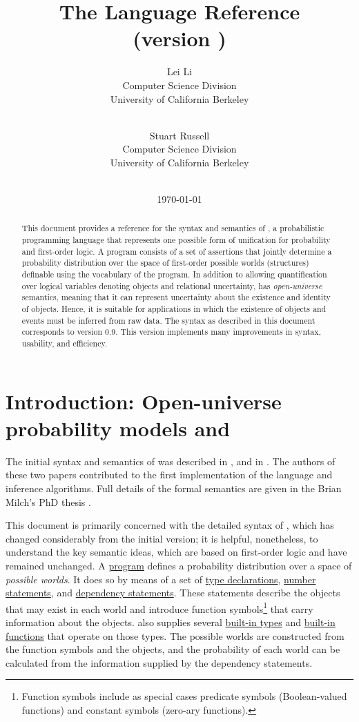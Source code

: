 \documentclass[12pt]{article}
\title{The \bl Language Reference  \\
{\large (\bl version \blogversion)}
}
\author{Lei Li\\
              Computer Science Division\\
              University of California Berkeley\\
               \email{leili@cs.berkeley.edu}\\
\and
               Stuart Russell\\
              Computer Science Division\\
              University of California Berkeley\\
               \email{russell@cs.berkeley.edu}\\
}
\date{\today}
\newcommand{\blogversion}{0.9\xspace}
\begin{document}
\maketitle


\begin{abstract}
This document provides a reference for the syntax and semantics of \bl, a probabilistic programming language
that represents one possible form of unification for probability and first-order logic.
A \bl program consists of a set of assertions that jointly determine a probability distribution
over the space of first-order possible worlds (structures) definable using the vocabulary of
the program. In addition to allowing quantification over logical variables denoting objects and relational uncertainty,
\bl has {\em open-universe} semantics, meaning that it can represent uncertainty about the existence and
identity of objects. Hence, it is suitable for applications in which the existence of objects and events must be inferred from raw data.
The syntax as described in this document corresponds to \bl version \blogversion. This version implements many
improvements in syntax, usability, and efficiency.
\end{abstract}

\clearpage

\tableofcontents

\clearpage

\section{Introduction: Open-universe probability models and \bl}\label{intro-section}

The initial syntax and semantics of \bl was described in \cite{milch2004blog},
and in \cite{milch2005blog}.
The authors of these two papers contributed to the first implementation of the \bl language and inference algorithms.
Full details of the formal semantics are given in the Brian Milch's PhD thesis \cite{milch2006probabilistic}.

This document is primarily concerned with the detailed syntax of \bl, which has changed considerably from the initial version;
it is helpful, nonetheless, to understand the key semantic ideas, which are based on first-order logic and have remained unchanged.
A \bl \hyperref[program-section]{program} defines a probability distribution over a space of {\em possible worlds}.
It does so by means of a set of \hyperref[type-declaration-section]{type declarations},
\hyperref[number-section]{number statements}, and \hyperref[dependency-section]{dependency statements}.
These statements describe the objects that may exist in each world and introduce function symbols\footnote{Function symbols include as special cases predicate symbols (Boolean-valued functions) and constant symbols (zero-ary functions).} that carry information about the objects. \bl also supplies several \hyperref[builtin-type-section]{built-in types}
and \hyperref[builtin-operator-appendix]{built-in functions} that operate on those types.
The possible worlds are constructed from the function symbols and the objects,
and the probability of each world can be calculated from the information supplied by the dependency statements.
\end{document}
